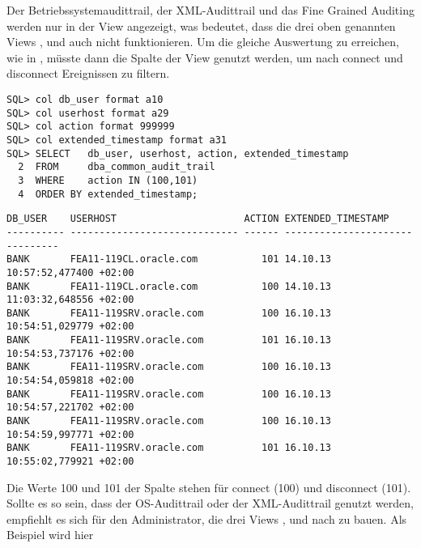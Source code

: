         Der Betriebssystemaudittrail, der XML-Audittrail und das Fine Grained
        Auditing werden nur in der View 
        angezeigt, was bedeutet, dass die drei oben genannten Views
        ,  und
        auch   nicht funktionieren. Um die
        gleiche Auswertung zu erreichen, wie in , m\"usste
        dann die Spalte  der View
         genutzt werden, um nach connect
        und disconnect Ereignissen zu filtern.
        \begin{lstlisting}[caption={Einen externen Audittrail auswerten},label=admin816,language=oracle_sql,alsolanguage=sqlplus]
SQL> col db_user format a10
SQL> col userhost format a29
SQL> col action format 999999
SQL> col extended_timestamp format a31
SQL> SELECT   db_user, userhost, action, extended_timestamp
  2  FROM     dba_common_audit_trail
  3  WHERE    action IN (100,101)
  4  ORDER BY extended_timestamp;
        \end{lstlisting}
\clearpage
        \begin{lstlisting}[caption={Einen externen Audittrail auswerten - Fortsetzung},language=oracle_sql,alsolanguage=sqlplus]
DB_USER    USERHOST                      ACTION EXTENDED_TIMESTAMP
---------- ----------------------------- ------ -------------------------------
BANK       FEA11-119CL.oracle.com           101 14.10.13 10:57:52,477400 +02:00
BANK       FEA11-119CL.oracle.com           100 14.10.13 11:03:32,648556 +02:00
BANK       FEA11-119SRV.oracle.com          100 16.10.13 10:54:51,029779 +02:00
BANK       FEA11-119SRV.oracle.com          101 16.10.13 10:54:53,737176 +02:00
BANK       FEA11-119SRV.oracle.com          100 16.10.13 10:54:54,059818 +02:00
BANK       FEA11-119SRV.oracle.com          100 16.10.13 10:54:57,221702 +02:00
BANK       FEA11-119SRV.oracle.com          100 16.10.13 10:54:59,997771 +02:00
BANK       FEA11-119SRV.oracle.com          101 16.10.13 10:55:02,779921 +02:00
        \end{lstlisting}
        Die Werte 100 und 101 der Spalte  stehen f\"ur
        connect (100) und disconnect (101). Sollte es so sein, dass der
        OS-Audittrail oder der XML-Audittrail genutzt werden, empfiehlt es sich
        f\"ur den Administrator, die drei Views
        ,  und
         nach zu bauen. Als Beispiel wird hier
